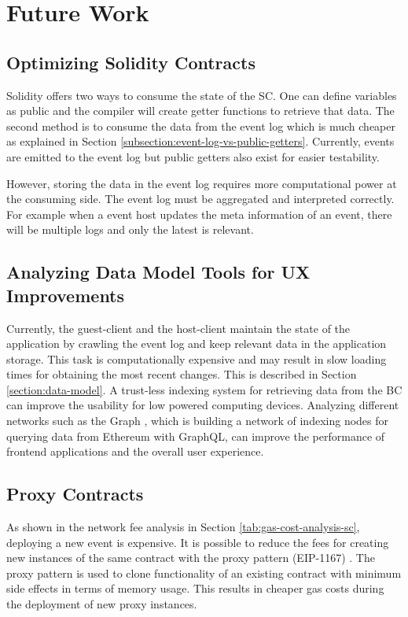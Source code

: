 \chapter{Future Work}

\section{Optimizing Solidity Contracts}
Solidity offers two ways to consume the state of the SC. One can define variables as public and the compiler will create getter functions to retrieve that data. The second method is to consume the data from the event log which is much cheaper as explained in Section \ref{subsection:event-log-vs-public-getters}. Currently, events are emitted to the event log but public getters also exist for easier testability.

However, storing the data in the event log requires more computational power at the consuming side. The event log must be aggregated and interpreted correctly. For example when a event host updates the meta information of an event, there will be multiple logs and only the latest is relevant. 

\section{Analyzing Data Model Tools for UX Improvements}
Currently, the guest-client and the host-client maintain the state of the application by crawling the event log and keep relevant data in the application storage. This task is computationally expensive and may result in slow loading times for obtaining the most recent changes. This is described in Section \ref{section:data-model}. A trust-less indexing system for retrieving data from the BC can improve the usability for low powered computing devices. Analyzing different networks such as the Graph \cite{the-graph}, which is building a network of indexing nodes for querying data from Ethereum with GraphQL, can improve the performance of frontend applications and the overall user experience.

\section{Proxy Contracts}
As shown in the network fee analysis in Section \ref{tab:gas-cost-analysis-sc}, deploying a new event is expensive. It is possible to reduce the fees for creating new instances of the same contract with the proxy pattern (EIP-1167) \cite{solidity-proxy-pattern}. The proxy pattern is used to clone functionality of an existing contract with minimum side effects in terms of memory usage. This results in cheaper gas costs during the deployment of new proxy instances. 

